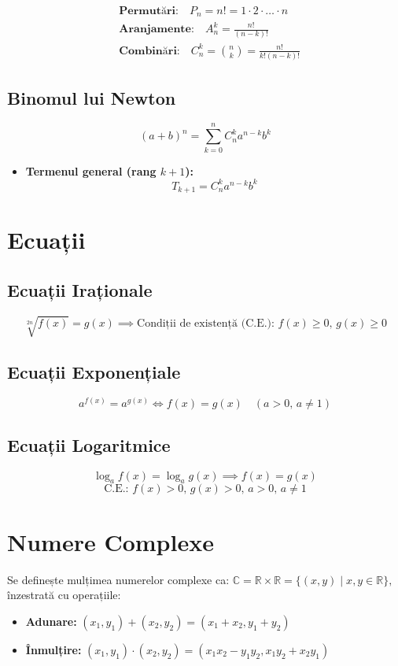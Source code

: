 \documentclass[11pt,a4paper]{article}
\begin{document}
\begin{align*}
    &\textbf{Permutări:} \quad P_n = n! = 1 \cdot 2 \cdot \dots \cdot n \\
    &\textbf{Aranjamente:} \quad A_n^k = \frac{n!}{(n-k)!} \\
    &\textbf{Combinări:} \quad C_n^k = \binom{n}{k} = \frac{n!}{k!(n-k)!}
\end{align*}

\subsection{Binomul lui Newton}
\[ (a+b)^n = \sum_{k=0}^{n} C_n^k a^{n-k} b^k \]
\begin{itemize}
    \item \textbf{Termenul general (rang $k+1$):} \[ T_{k+1} = C_n^k a^{n-k} b^k \]
\end{itemize}
\section{Ecuații}

\subsection{Ecuații Iraționale}
\[ \sqrt[2n]{f(x)} = g(x) \implies \text{Condiții de existență (C.E.): } f(x) \ge 0, \, g(x) \ge 0 \]

\subsection{Ecuații Exponențiale}
\[ a^{f(x)} = a^{g(x)} \iff f(x) = g(x) \quad (a > 0, \, a \neq 1) \]

\subsection{Ecuații Logaritmice}
\[ \log_{a} f(x) = \log_{a} g(x) \implies f(x) = g(x) \]
\[ \text{C.E.: } f(x) > 0, \, g(x) > 0, \, a > 0, \, a \neq 1 \]
  \section{Numere Complexe}

Se definește mulțimea numerelor complexe ca: \quad
$\mathbb{C} = \mathbb{R} \times \mathbb{R} = \{ (x,y) \mid x,y \in \mathbb{R} \},
$\quad
înzestrată cu operațiile:

\begin{itemize}
    \item \textbf{Adunare:} \qquad $(x_1,y_1) + (x_2,y_2) = (x_1+x_2, y_1+y_2)$
    
    \item \textbf{Înmulțire:} \quad $
    (x_1,y_1) \cdot (x_2,y_2) = (x_1x_2 - y_1y_2, x_1y_2 + x_2y_1)$
\end{itemize}
\end{document}
